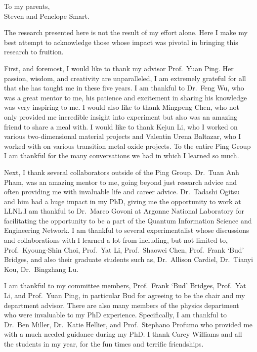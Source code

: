 \begin{dedication}
\vspace*{\fill}
\begin{center}
    To my parents, \\
    Steven and Penelope Smart.
\end{center}
\vspace*{\fill}
\end{dedication}


\begin{acknowledgements}
    The research presented here is not the result of my effort alone. Here I make my best attempt to acknowledge those whose impact was pivotal in bringing this research to fruition.

    First, and foremost, I would like to thank my advisor Prof.\ Yuan Ping. Her passion, wisdom, and creativity are unparalleled, I am extremely grateful for all that she has taught me in these five years. I am thankful to Dr.\ Feng Wu, who was a great mentor to me, his patience and excitement in sharing his knowledge was very inspiring to me. I would also like to thank Mingpeng Chen, who not only provided me incredible insight into experiment but also was an amazing friend to share a meal with. I would like to thank Kejun Li, who I worked on various two-dimensional material projects and Valentin Urena Baltazar, who I worked with on various transition metal oxide projects. To the entire Ping Group I am thankful for the many conversations we had in which I learned so much.

    Next, I thank several collaborators outside of the Ping Group. Dr.\ Tuan Anh Pham, was an amazing mentor to me, going beyond just research advice and often providing me with invaluable life and career advice. Dr.\ Tadashi Ogitsu and him had a huge impact in my PhD, giving me the opportunity to work at LLNL.\@ I am thankful to Dr.\ Marco Govoni at Argonne National Laboratory for facilitating the opportunity to be a part of the Quantum Information Science and Engineering Network. I am thankful to several experimentalist whose discussions and collaborations with I learned a lot from including, but not limited to, Prof.\ Kyoung-Shin Choi, Prof.\ Yat Li, Prof.\ Shaowei Chen, Prof.\ Frank `Bud' Bridges, and also their graduate students such as, Dr.\ Allison Cardiel, Dr.\ Tianyi Kou, Dr.\ Bingzhang Lu.

    I am thankful to my committee members, Prof.\ Frank `Bud' Bridges, Prof.\ Yat Li, and Prof.\ Yuan Ping, in particular Bud for agreeing to be the chair and my department advisor. There are also many members of the physics department who were invaluable to my PhD experience. Specifically, I am thankful to Dr.\ Ben Miller, Dr.\ Katie Hellier, and Prof.\ Stephano Profumo who provided me with a much needed guidance during my PhD. I thank Carey Williams and all the students in my year, for the fun times and terrific friendships.


\end{acknowledgements}

